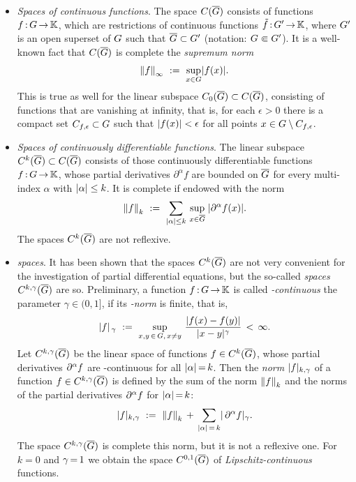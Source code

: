 \documentclass[11pt,twoside]{article}
\begin{document}
\begin{itemize}[leftmargin=15pt,itemsep=6pt]
\item[1.] \textit{Spaces of continuous functions}.
The space $C(\overline{G})$ consists of functions $f{\,:\,}G {\,\to\,} {\mathbb{K}}$,
which are restrictions of continuous functions $\tilde{f}{\,:\,}G' {\,\to\,} {\mathbb{K}}$,
where $G'$ is an open superset of $G$
such that $\overline{G} \subset G'$
(notation: $G \Subset G'$).
It is a well-known fact that
$C(\overline{G})$ is complete {\wrt} the \textit{supremum norm}
\[
\norm{f}_{\infty} \, \eqdef \, \sup_{x \in \G} \abs{f(x)} .
\]
This is true as well for the linear subspace $C_0(\overline{G}) \subset C(\overline{G})$,
consisting of functions that are vanishing at infinity,
that is,
for each $\epsilon > 0$
there is a compact set $C_{f,\epsilon} \subset G$
such that
$\abs{f(x)} < \epsilon$
for all points $x \in G \setminus C_{f,\epsilon}$.

\item[2.] \textit{Spaces of continuously differentiable functions}.
The linear subspace $C^k(\overline{G}) \subset C(\overline{G})$
consists of those continuously differentiable functions $f{\,:\,}G {\,\to\,} {\mathbb{K}}$,
whose partial derivatives $\partial^{\alpha} f$ are bounded on $\overline{G}$
for every multi-index $\alpha$ with $\abs{\alpha} \leq k$.
It is complete if endowed with the norm
\[
\norm{f}_k
\, \eqdef \,
\sum_{\abs{\alpha} \leq k} \,
\sup_{x \in \clG } \; \abs{\partial^{\alpha} f(x)} .
\]
The spaces $C^k(\overline{G})$ are not reflexive.

\item[3.] \textit{{\HOELDER} spaces}.
It has been shown
that the spaces $C^k(\overline{G})$ are not very convenient
for the investigation of partial differential equations,
but the so-called \textit{{\HOELDER} spaces} $C^{k,\gamma}(\overline{G})$ are so.
Preliminary,
a function $f{\,:\,}G {\,\to\,} {\mathbb{K}}$ is called \textit{{\HOELDER}-continuous}
{\wrt} the parameter $\gamma \in (0,1]$,
if its \textit{{\HOELDER}-norm} is finite,
that is,
\[
\abs{f} _{\,\gamma} \, \eqdef \,
\sup_{x,y \, \in \, \G, \, x \neq y} \,
\frac{\abs{f(x) - f(y)} } {\abs{x-y} ^{\gamma}} \, < \, \infty.
\]
Let $C^{k,\gamma}(\overline{G})$ be the linear space
of functions $f \in C^k(\overline{G})$,
whose partial derivatives $\partial^{\alpha} f$
are {\HOELDER}-continuous for all $\abs{\alpha} \eq k$.
Then the \textit{{\HOELDER} norm} $\abs{f} _{k,\gamma}$
of a function $f \in C^{k,\gamma}(\overline{G})$ is defined
by the sum of the norm $\left\lVert f \right\rVert_k$
and the {\HOELDER} norms of the partial derivatives $\partial^{\alpha} f$
for $\abs{\alpha} \eq k$:
\[
\abs{f} _{k,\gamma}
\, \eqdef \,
\norm{f}_k
\, + \,
\sum_{\abs{\alpha} \eq k} \abs{\,\PA f} _\gamma.
\]
The space $C^{k,\gamma}(\overline{G})$ is complete {\wrt} this norm,
but it is not a reflexive one.
For $k=0$ and $\gamma {\,=\,} 1$ we obtain the space
$C^{0,1}(\overline{G})$ of \textit{Lipschitz-continuous} functions.


\end{itemize}
\end{document}
